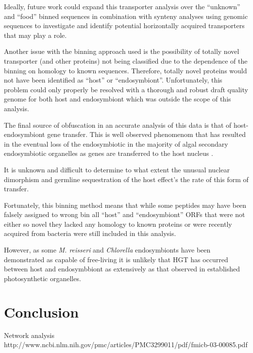 Ideally, future work could expand this transporter analysis over the 
``unknown'' and ``food'' binned sequences in combination with synteny
analyses using genomic sequences to investigate and identify
potential horizontally acquired transporters that may play a role.

Another issue with the binning approach used is the possibility
of totally novel transporter (and other proteins) not being classified
due to the dependence of the binning on homology to known sequences.
Therefore, totally novel proteins would not have been identified as 
``host'' or ``endosymbiont''.  Unfortunately, this problem 
could only properly be resolved with a thorough and robust 
draft quality genome for both host and endosymbiont which was outside
the scope of this analysis. 

The final source of obfuscation in an accurate analysis of this data
is that of host-endosymbiont gene transfer.  
This is well observed phenomenom that has resulted in the eventual loss
of the endosymbiotic in the majority of algal secondary endosymbiotic organelles
as genes are transferred to the host nucleus
\citep{Keeling2008a,Archibald2005,Keeling2004}.

It is unknown and difficult to determine to what extent the 
unusual nuclear dimorphism and germline sequestration of the host 
effect's the rate of this form of transfer. 

Fortunately, this binning method means that while some peptides
may have been falsely assigned to wrong bin all ``host'' and
``endosymbiont'' ORFs that were not either so novel they lacked
any homology to known proteins or were recently acquired from
bacteria were still included in this analysis. 

However, as some \textit{M. reisseri} and \textit{Chlorella} endosymbionts 
have been demonstrated as capable of free-living it is unlikely
that HGT has occurred between host and endosymbbiont as extensively
as that observed in established photosynthetic organelles. 






\section{Conclusion}


Network analysis
http://www.ncbi.nlm.nih.gov/pmc/articles/PMC3299011/pdf/fmicb-03-00085.pdf

